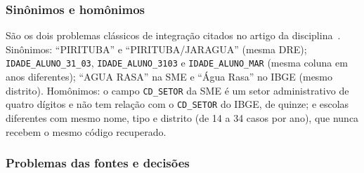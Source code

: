 \documentclass[11pt,a4paper]{article}
\newcommand{\cod}[1]{\texttt{#1}}
\begin{document}
\subsubsection{Sinônimos e homônimos}

São os dois problemas clássicos de integração citados no artigo da disciplina~\cite{ciferri-saude}. Sinônimos: ``PIRITUBA'' e ``PIRITUBA/JARAGUA'' (mesma DRE); \cod{IDADE_ALUNO_31_03}, \cod{IDADE_ALUNO_3103} e \cod{IDADE_ALUNO_MAR} (mesma coluna em anos diferentes); ``AGUA RASA'' na SME e ``Água Rasa'' no IBGE (mesmo distrito). Homônimos: o campo \cod{CD_SETOR} da SME é um setor administrativo de quatro dígitos e não tem relação com o \cod{CD_SETOR} do IBGE, de quinze; e escolas diferentes com mesmo nome, tipo e distrito (de 14 a 34 casos por ano), que nunca recebem o mesmo código recuperado.

\subsubsection{Problemas das fontes e decisões}
\end{document}
